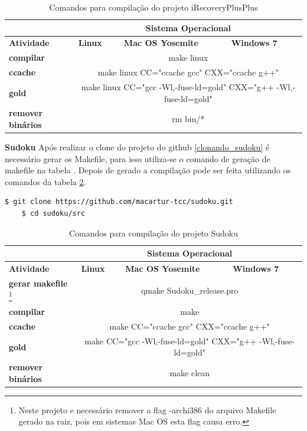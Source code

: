 \begin{itemize}
\begin{table}[h]
\begin{tabular}{p{2cm}p{2cm}p{2cm}p{2cm}}
\toprule
 & \multicolumn{3}{c}{Sistema Operacional} \\ \toprule 
\textbf{Atividade} & \textbf{Linux} & \textbf{Mac OS Yosemite} & \textbf{Windows 7}  \\ \midrule 
\textbf{compilar} & \multicolumn{3}{c}{make linux} \\ \midrule
\textbf{ccache} & \multicolumn{3}{c}{make linux CC="ccache gcc" CXX="ccache g++"} \\ \midrule
\textbf{gold} & \multicolumn{3}{c}{make linux  CC="gcc -Wl,-fuse-ld=gold" CXX="g++ -Wl,-fuse-ld=gold"} \\ \midrule
\textbf{remover binários} & \multicolumn{3}{c}{rm bin/*} \\ \bottomrule
\end{tabular} 
\caption{Comandos para compilação do projeto iRecoveryPlusPlus}
\label{t_compilacao_irecoveryplusplus}
\end{table}

    \subitem \textbf{Sudoku}
    \subitem Após realizar o clone do projeto do github
 \ref{clonando_sudoku} é necessário  gerar os Makefile,
 para isso utiliza-se o comando de geração de makefile na tabela .
Depois de gerado a compilação pode ser feita utilizando
 os comandos da tabela \ref{t_compilacao_sudoku}.

    
\begin{lstlisting}[language=bash, caption={Clonado Projeto iRecoveryplusplus},
                  label=clonando_sudoku]
    $ git clone https://github.com/macartur-tcc/sudoku.git 
    $ cd sudoku/src
\end{lstlisting}


\begin{table}[h]
\begin{tabular}{p{2cm}p{2cm}p{2cm}p{2cm}}
\toprule
 & \multicolumn{3}{c}{Sistema Operacional} \\ \toprule 
\textbf{Atividade} & \textbf{Linux} & \textbf{Mac OS Yosemite} & \textbf{Windows 7}  \\ \midrule 
\textbf{gerar makefile}
\footnote{Neste projeto e necessário remover a flag -archi386 do arquivo Makefile gerado na raiz, pois em sistemas Mac OS esta flag causa erro.}
 & \multicolumn{3}{c}{qmake Sudoku\_release.pro} \\ \midrule
\textbf{compilar} & \multicolumn{3}{c}{make } \\ \midrule
\textbf{ccache} & \multicolumn{3}{c}{make CC="ccache gcc" CXX="ccache g++"} \\ \midrule
\textbf{gold} & \multicolumn{3}{c}{make  CC="gcc -Wl,-fuse-ld=gold" CXX="g++ -Wl,-fuse-ld=gold"} \\ \midrule
\textbf{remover binários} & \multicolumn{3}{c}{make clean} \\ \bottomrule
\end{tabular} 
\caption{Comandos para compilação do projeto Sudoku}
\label{t_compilacao_sudoku}
\end{table}




\end{itemize}

